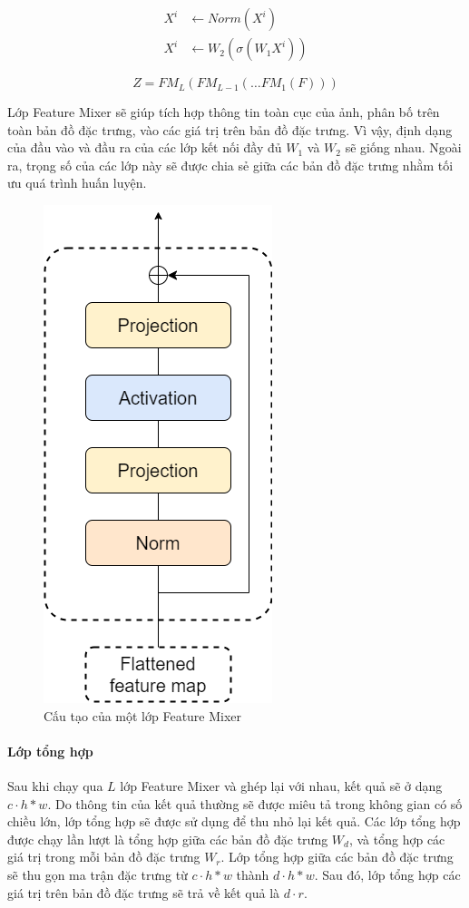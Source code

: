 $$
\begin{aligned}
    X^{i} & \leftarrow Norm(X^{i}) \\
    X^{i} & \leftarrow W_2(\sigma(W_1 X^{i}))
\end{aligned}
$$

$$
Z = FM_L(FM_{L-1}(\dots FM_1(F)))
$$

Lớp Feature Mixer sẽ giúp tích hợp thông tin toàn cục của ảnh, phân bố trên toàn bản đồ đặc trưng, vào các giá trị trên bản đồ đặc trưng. Vì vậy, định dạng của đầu vào và đầu ra của các lớp kết nối đầy đủ $W_1$ và $W_2$ sẽ giống nhau. Ngoài ra, trọng số của các lớp này sẽ được chia sẻ giữa các bản đồ đặc trưng nhằm tối ưu quá trình huấn luyện.

\begin{figure}[H]
    \centering
    \includegraphics[scale=0.6]{pics/Proposal/mixer.png}
    \caption{Cấu tạo của một lớp Feature Mixer \cite{alibey2023mixvpr}}
\end{figure}

\paragraph*{Lớp tổng hợp}

Sau khi chạy qua $L$ lớp Feature Mixer và ghép lại với nhau, kết quả sẽ ở dạng $c \cdot h*w$. Do thông tin của kết quả thường sẽ được miêu tả trong không gian có số chiều lớn, lớp tổng hợp sẽ được sử dụng để thu nhỏ lại kết quả. Các lớp tổng hợp được chạy lần lượt là tổng hợp giữa các bản đồ đặc trưng $W_d$, và tổng hợp các giá trị trong mỗi bản đồ đặc trưng $W_r$. Lớp tổng hợp giữa các bản đồ đặc trưng sẽ thu gọn ma trận đặc trưng từ $c \cdot h*w$ thành $d \cdot h*w$. Sau đó, lớp tổng hợp các giá trị trên bản đồ đặc trưng sẽ trả về kết quả là $d \cdot r$.

